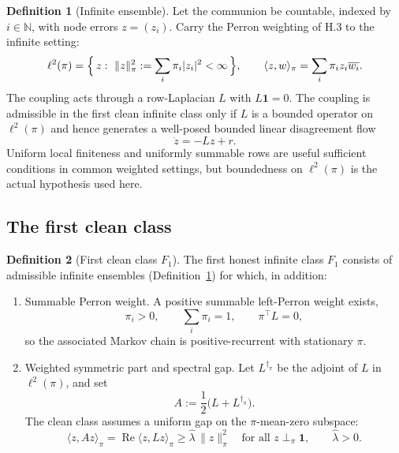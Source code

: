 \documentclass[11pt,a4paper]{article}
\def\mathfrak#1{#1}%
\def\emph#1{#1}%
\theoremstyle{definition}
\newtheorem{definition}{Definition}[section]
\theoremstyle{plain}
\theoremstyle{remark}
\begin{document}
\begin{definition}[Infinite ensemble]\label{def:infensemble}
Let the communion be \emph{countable}, indexed by \(i\in\mathbb N\), with node
errors \(z=(z_i)\). Carry the Perron weighting of H.3 to the infinite setting:
\[
\ell^2(\pi)
=
\Bigl\{\,z:\ \lVert z\rVert_\pi^2:=\sum_i\pi_i\lvert z_i\rvert^2<\infty\,\Bigr\},
\qquad
\langle z,w\rangle_\pi=\sum_i\pi_i z_i\overline{w_i}.
\]
The coupling acts through a row-Laplacian \(L\) with \(L\mathbf 1=0\). The coupling
is \emph{admissible} in the first clean infinite class only if \(L\) is a bounded
operator on \(\ell^2(\pi)\) and hence generates a well-posed bounded linear
disagreement flow
\[
\dot z=-Lz+r.
\]
Uniform local finiteness and uniformly summable rows are useful sufficient
conditions in common weighted settings, but boundedness on \(\ell^2(\pi)\) is the
actual hypothesis used here.
\end{definition}

\subsection{The first clean class}

\begin{definition}[First clean class \(\mathfrak F_1\)]\label{def:firstclass}
The first honest infinite class \(\mathfrak F_1\) consists of admissible infinite
ensembles (Definition~\ref{def:infensemble}) for which, in addition:
\begin{enumerate}[label=\textup{(\alph*)},leftmargin=1.2cm]
\item \emph{Summable Perron weight.} A positive summable left-Perron weight exists,
\[
\pi_i>0,
\qquad
\sum_i\pi_i=1,
\qquad
\pi^\top L=0,
\]
so the associated Markov chain is positive-recurrent with stationary \(\pi\).

\item \emph{Weighted symmetric part and spectral gap.} Let \(L^{\dagger_\pi}\) be
the adjoint of \(L\) in \(\ell^2(\pi)\), and set
\[
A:=\frac12\bigl(L+L^{\dagger_\pi}\bigr).
\]
The clean class assumes a uniform gap on the \(\pi\)-mean-zero subspace:
\[
\boxed{\;
\langle z,Az\rangle_\pi
=
\operatorname{Re}\langle z,Lz\rangle_\pi
\ge
\widehat\lambda\,\lVert z\rVert_\pi^2
\quad\text{for all }z\perp_\pi\mathbf 1,
\qquad
\widehat\lambda>0 .
\;}
\]
\end{enumerate}
\end{definition}
\end{document}
